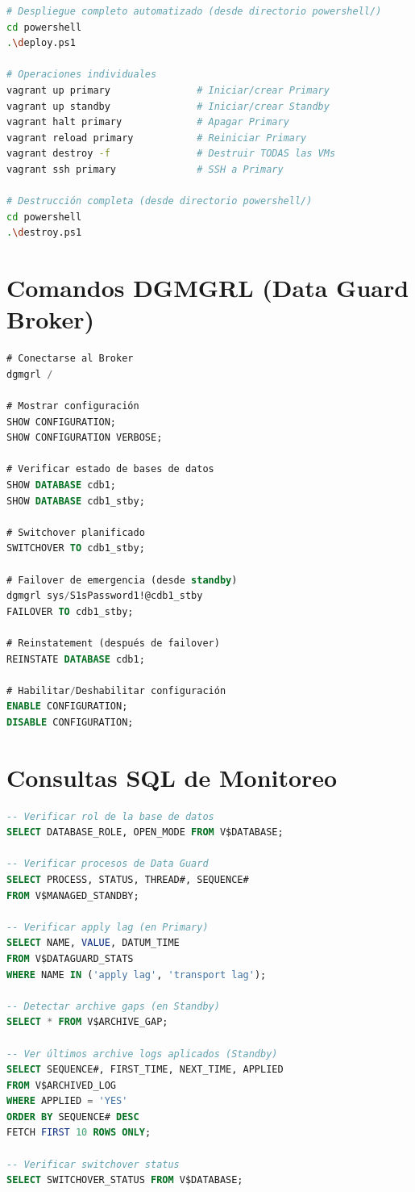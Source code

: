 \documentclass[11pt, a4paper]{report}
\begin{document}
\begin{lstlisting}[language=bash, caption={Operaciones con Vagrant}]
# Despliegue completo automatizado (desde directorio powershell/)
cd powershell
.\deploy.ps1

# Operaciones individuales
vagrant up primary               # Iniciar/crear Primary
vagrant up standby               # Iniciar/crear Standby
vagrant halt primary             # Apagar Primary
vagrant reload primary           # Reiniciar Primary
vagrant destroy -f               # Destruir TODAS las VMs
vagrant ssh primary              # SSH a Primary

# Destrucción completa (desde directorio powershell/)
cd powershell
.\destroy.ps1
\end{lstlisting}

\section{Comandos DGMGRL (Data Guard Broker)}

\begin{lstlisting}[language=SQL, caption={Operaciones con Data Guard Broker}]
# Conectarse al Broker
dgmgrl /

# Mostrar configuración
SHOW CONFIGURATION;
SHOW CONFIGURATION VERBOSE;

# Verificar estado de bases de datos
SHOW DATABASE cdb1;
SHOW DATABASE cdb1_stby;

# Switchover planificado
SWITCHOVER TO cdb1_stby;

# Failover de emergencia (desde standby)
dgmgrl sys/S1sPassword1!@cdb1_stby
FAILOVER TO cdb1_stby;

# Reinstatement (después de failover)
REINSTATE DATABASE cdb1;

# Habilitar/Deshabilitar configuración
ENABLE CONFIGURATION;
DISABLE CONFIGURATION;
\end{lstlisting}

\section{Consultas SQL de Monitoreo}

\begin{lstlisting}[language=SQL, caption={Verificación de Estado Data Guard}]
-- Verificar rol de la base de datos
SELECT DATABASE_ROLE, OPEN_MODE FROM V$DATABASE;

-- Verificar procesos de Data Guard
SELECT PROCESS, STATUS, THREAD#, SEQUENCE#
FROM V$MANAGED_STANDBY;

-- Verificar apply lag (en Primary)
SELECT NAME, VALUE, DATUM_TIME
FROM V$DATAGUARD_STATS
WHERE NAME IN ('apply lag', 'transport lag');

-- Detectar archive gaps (en Standby)
SELECT * FROM V$ARCHIVE_GAP;

-- Ver últimos archive logs aplicados (Standby)
SELECT SEQUENCE#, FIRST_TIME, NEXT_TIME, APPLIED
FROM V$ARCHIVED_LOG
WHERE APPLIED = 'YES'
ORDER BY SEQUENCE# DESC
FETCH FIRST 10 ROWS ONLY;

-- Verificar switchover status
SELECT SWITCHOVER_STATUS FROM V$DATABASE;
\end{lstlisting}
\end{document}
